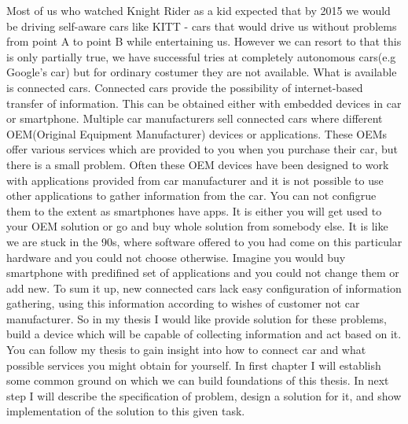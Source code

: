 Most of us who watched Knight Rider as a kid expected that by 2015 we would be driving self-aware cars like KITT - cars that would drive us without problems from point A to point B while entertaining us. However we can resort to that this is only partially true, we have successful tries at completely autonomous cars(e.g Google’s car) but for ordinary costumer they are not available. What is available is connected cars. Connected cars provide the possibility of internet-based transfer of information. This can be obtained either with embedded devices in car or smartphone. Multiple car manufacturers sell connected cars where different OEM(Original Equipment Manufacturer) devices or applications. These OEMs offer various services which are provided to you when you purchase their car, but there is a small problem. Often these OEM devices have been designed to work with applications provided from car manufacturer and it is not possible to use other applications to gather information from the car. You can not configrue them to the extent as smartphones have apps. It is either you will get used to your OEM solution or go and buy whole solution from somebody else. It is like we are stuck in the 90s, where software offered to you had come on this particular hardware and you could not choose otherwise.  Imagine you would buy smartphone with predifined set of applications and you could not change them or add new. To sum it up, new connected cars lack easy configuration of information gathering, using this information according to wishes of customer not car manufacturer. So in my thesis I would like provide solution for these problems, build a device which will be capable of collecting information and act based on it. You can follow my thesis to gain insight into how to connect car and what possible services you might obtain for yourself. In first chapter I will establish some common ground on which we can build foundations of this thesis. In next step I will describe the specification of problem, design a solution for it, and show implementation of the solution to this given task.